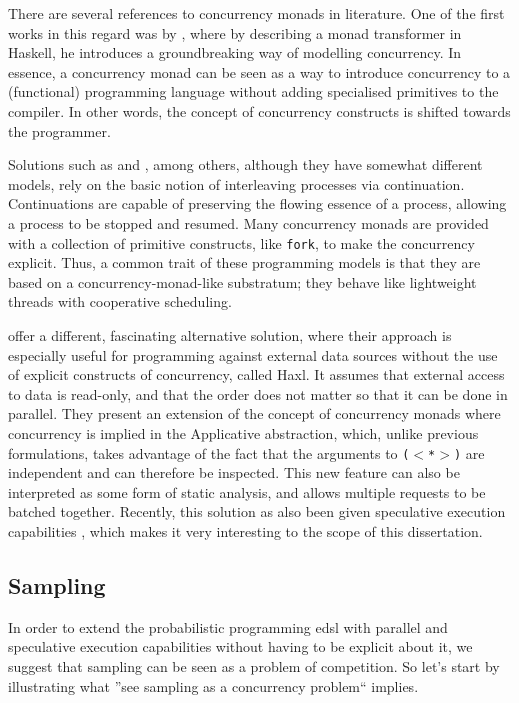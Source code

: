 \documentclass[
  oneside,
  11pt, a4paper,
  footinclude=true,
  headinclude=true,
  cleardoublepage=empty
]{scrbook}
\theoremstyle{definition}
\theoremstyle{definition}
\begin{document}
    There are several references to concurrency monads in literature. One of the first works in this regard was by \cite{Claessen1999FunctionalPA}, where by describing a monad transformer in Haskell, he introduces a groundbreaking way of modelling concurrency. In essence, a concurrency monad can be seen as a way to introduce concurrency to a (functional) programming language without adding specialised primitives to the compiler. In other words, the concept of concurrency constructs is shifted towards the programmer.
    
    Solutions such as \cite{Claessen1999FunctionalPA} and \cite{Scholz1995ACM}, among others, although they have somewhat different models, rely on the basic notion of interleaving processes via continuation. Continuations are capable of preserving the flowing essence of a process, allowing a process to be stopped and resumed. Many concurrency monads are provided with a collection of primitive constructs, like \texttt{fork}, to make the concurrency explicit. Thus, a common trait of these programming models is that they are based on a concurrency-monad-like substratum; they behave like lightweight threads with cooperative scheduling.
    
    \cite{Marlow:2014:NFA:2692915.2628144} offer a different, fascinating alternative solution, where their approach is especially useful for programming against external data sources without the use of explicit constructs of concurrency, called Haxl. It assumes that external access to data is read-only, and that the order does not matter so that it can be done in parallel. They present an extension of the concept of concurrency monads where concurrency is implied in the Applicative abstraction, which, unlike previous formulations, takes advantage of the fact that the arguments to \texttt{($<$*$>$)} are independent and can therefore be inspected. This new feature can also be interpreted as some form of static analysis, and allows multiple requests to be batched together. Recently, this solution as also been given speculative execution capabilities \citep{andrey2019selective}, which makes it very interesting to the scope of this dissertation.
    
    \subsection{Sampling}
    
    In order to extend the probabilistic programming \gls{edsl} with parallel and speculative execution capabilities without having to be explicit about it, we suggest that sampling can be seen as a problem of competition. So let's start by illustrating what ''see sampling as a concurrency problem`` implies.
    
\end{document}
